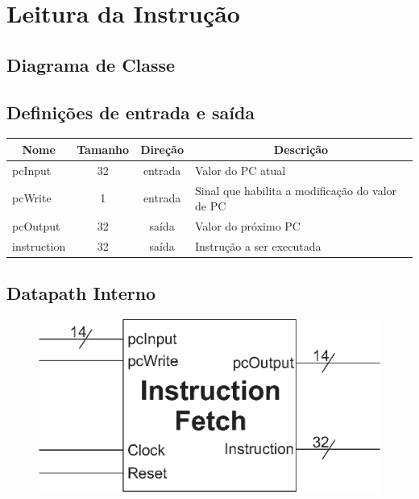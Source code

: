 \section{Leitura da Instrução}
	\subsection{Diagrama de Classe}
  \begin{figure}[H]
    
  \end{figure}
		
		\subsection{Definições de entrada e saída}
		
	\begin{center}
		\begin{longtable}[pos]{| l | c | c | m{7cm} |} \hline
			\multicolumn{1}{|c|}{\cellcolor[gray]{0.9}\textbf{Nome}} & 
			\multicolumn{1}{c|}{\cellcolor[gray]{0.9}\textbf{Tamanho}} & 
			\multicolumn{1}{c|}{\cellcolor[gray]{0.9}\textbf{Direção}} &
			\multicolumn{1}{c|}{\cellcolor[gray]{0.9}\textbf{Descrição}} \\ \hline
			\endhead
			\hline
			\endlastfoot
			pcInput & 32 & entrada & Valor do PC atual\\ \hline
			pcWrite & 1 & entrada & Sinal que habilita a modificação do valor de PC \\ \hline
			pcOutput & 32 & saída & Valor do próximo PC \\ \hline
			instruction & 32 & saída & Instrução a ser executada \\ \hline
			
		\end{longtable}
	\end{center}
	
	\subsection{Datapath Interno}
	\begin{figure}[htpb!]
		\begin{center}
		\includegraphics[scale=0.5]{./datapath/Graphic1.eps}
		\end{center}
	\end{figure}
	
